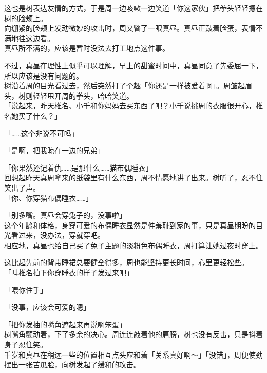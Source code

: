 这也是树表达友情的方式，于是周一边咳嗽一边笑道「你这家伙」把拳头轻轻摁在树的脸颊上。\\

向绷紧的脸颊上发动微妙的攻击时，周又瞥了一眼真昼。真昼正鼓着脸蛋，表情不满地往这边看。\\

真昼所不满的，应该是暂时没法去打工地点这件事。

不过，真昼在理性上似乎可以理解，早上的甜蜜时间中，真昼同意了先委屈一下，所以应该是没有问题的。\\

树沿着周的目光看过去，然后突然打了个趣「你还是一样被爱着啊」。周皱起眉头，树则轻轻甩开周的拳头，哈哈笑道。\\

「说起来，昨天椎名、小千和你妈妈去买东西了吧？小千说挑周的衣服很开心，椎名她买了什么？」

「……这个非说不可吗」

「是啊，把我晾在一边的兄弟」

「你果然还记着仇……是那什么……猫布偶睡衣」\\

回想起昨天真周拿来的纸袋里有什么东西，周不情愿地讲了出来。树听了，忍不住笑出了声。\\

「你、你穿猫布偶睡衣……」

「别多嘴。真昼会穿兔子的，没事啦」\\

这个年龄和体格，身穿可爱的布偶睡衣显然是件羞耻到家的事，只是真昼期盼的目光看过来，没办法，穿就穿吧。\\

相应地，真昼也给自己买了兔子主题的淡粉色布偶睡衣，周打算让她过夜时穿上。

这比起先前的背带睡裙总要健全得多，周也能坚持更长时间，心里更轻松些。\\

「叫椎名拍下你穿睡衣的样子发过来吧」

「喂你住手」

「没事，应该会可爱的嗯」

「把你发抽的嘴角遮起来再说啊笨蛋」\\

树嘴角颤动着，下了多余的决心。周连连敲着他的肩膀，树也没有反击，只是抖着身子忍住笑。\\

千岁和真昼在稍远一些的位置相互点头应和着「关系真好啊～」「没错」，周便使劲摆出一张苦瓜脸，向树发起了缓和的攻击。
